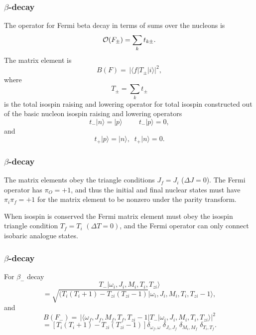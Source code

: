 \documentclass{beamer}
\begin{document}
\begin{frame}
\frametitle{$\beta$-decay}

\begin{block}{}
The operator for Fermi beta decay in terms of sums
over the nucleons is
\[
{\cal O}(F_{\pm}) =  \displaystyle\sum _{k} t_{k\pm}.
\]
The matrix element is
\[
B(F) =\, \vert \langle f\vert  T_{\pm} \vert i\rangle\vert ^{2}, 
\]
where
\[
T_{\pm} = \sum _{k} t_{\pm}  
\]
is the total isospin raising and lowering operator for total
isospin constructed out of the
basic nucleon isospin raising and lowering operators
\[
t_{-}\vert n\rangle=\vert p\rangle \hspace{1cm} t_{-}\vert p\rangle= 0,
\]
and
\[
t_{+}\vert p\rangle=\vert n\rangle, \;\; t_{+}\vert n\rangle= 0.  
\]
\end{block}
\end{frame}

\begin{frame}
\frametitle{$\beta$-decay}

\begin{block}{}
The matrix elements obey the triangle
conditions $J_{f}=J_{i}$ ($\Delta J=0$). The Fermi operator has
$\pi _{O}=+1$, and thus the
initial and final nuclear states must have $\pi _{i}\pi _{f}=+1$ for
the matrix element to be
nonzero under the parity transform.

When isospin is conserved
the Fermi matrix element must obey the isospin triangle condition
$T_{f}=T_{i}$ $(\Delta T=0)$, and the Fermi operator can only connect
isobaric analogue states.
\end{block}
\end{frame}

\begin{frame}
\frametitle{$\beta$-decay}

\begin{block}{}
For $\beta_{-}$ decay
\[
T_{-}\vert \omega _{i},J_{i},M_{i},T_{i},T_{zi}\rangle
\]
\[
= \sqrt{(T_{i}(T_{i}+1)-T_{zi}(T_{zi}-1)}\vert \omega _{i},J_{i},M_{i},T_{i},T_{zi}-1\rangle,      
\]
and
\[
B(F_{-}) =\, \vert \langle \omega _{f},J_{f},M_{f},T_{f},T_{zi}-1\vert T_{-}\vert \omega 
_{i},J_{i},M_{i},T_{i},T_{zi}\rangle\vert ^{2}
\]
\[
= [T_{i}(T_{i}+1)-T_{zi}(T_{zi}-1)]
\delta _{\omega _{f},\omega }\;\delta _{J_{i},J_{f}}\;\delta _{M_{i},M_{f}}\;\delta _{T_{i},T_{f}}. 
\]
\end{block}
\end{frame}
\end{document}
